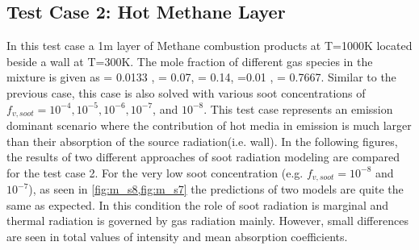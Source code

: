 \documentclass[3p]{elsarticle}
\begin{document}
\subsection{Test Case 2: Hot Methane Layer}
In this test case a 1m layer of Methane combustion products at T=1000K located beside a wall at T=300K.  The mole fraction of different gas species in the mixture is given as   = 0.0133 , = 0.07, = 0.14, =0.01 , = 0.7667. Similar to the previous case, this case is also solved with various soot concentrations of \(f_{v,soot}=10^{-4}, 10^{-5}, 10^{-6}, 10^{-7}\), and \(10^{-8}\). This test case represents an emission dominant scenario where the contribution of hot media in emission is much larger than their absorption of the source radiation(i.e. wall). 
In the following figures, the results of two different approaches of soot radiation modeling are compared for the test case 2.
For the very low soot concentration (e.g. \(f_{v,soot}=10^{-8}\) and \(10^{-7}\)), as seen in  \cref{fig:m_s8,fig:m_s7} the predictions of two models are quite the same as expected. In this condition the role of soot radiation is marginal and thermal radiation is governed by gas radiation mainly. However, small differences are seen in total values of intensity and mean absorption coefficients. 
\end{document}
